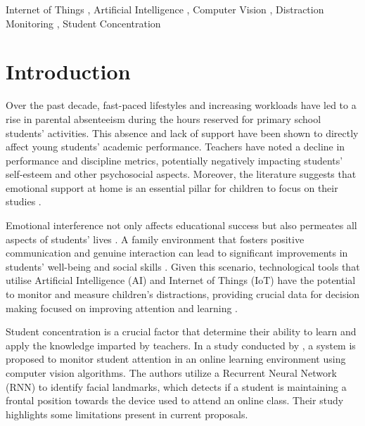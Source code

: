 \documentclass[a4paper,fleqn]{cas-sc}
\begin{document}
	\begin{keywords}
		Internet of Things \sep
		Artificial Intelligence \sep
		Computer Vision \sep
		Distraction Monitoring \sep
		Student Concentration
	\end{keywords}

	\maketitle

	\section{Introduction}
	\label{seccion:Uno}
		Over the past decade, fast-paced lifestyles and increasing workloads have led to a rise in parental absenteeism during the hours reserved for primary school students' activities. This absence and lack of support have been shown to directly affect young students' academic performance. Teachers have noted a decline in performance and discipline metrics, potentially negatively impacting students' self-esteem and other psychosocial aspects. Moreover, the literature suggests that emotional support at home is an essential pillar for children to focus on their studies \citep{Abdul-Aziz2022}.

		Emotional interference not only affects educational success but also permeates all aspects of students' lives \citep{Ake2023}. A family environment that fosters positive communication and genuine interaction can lead to significant improvements in students' well-being and social skills \citep{Navarro2024}. Given this scenario, technological tools that utilise Artificial Intelligence (AI) and Internet of Things (IoT) have the potential to monitor and measure children's distractions, providing crucial data for decision making focused on improving attention and learning \citep{Alvear-Puertas2017,Berrezueta-Guzman2021}.

		Student concentration is a crucial factor that  determine their ability to learn and apply the knowledge imparted by teachers. In a study conducted by %
		\cite{Terraza2022}, a system is proposed to monitor student attention in an online learning environment using computer vision algorithms. The authors utilize a Recurrent Neural Network (RNN) to identify facial landmarks, which detects if a student is maintaining a frontal position towards the device used to attend an online class. Their study highlights some limitations present in current proposals.
\end{document}
